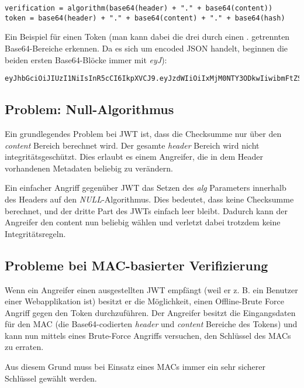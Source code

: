 \begin{verbatim}
verification = algorithm(base64(header) + "." + base64(content))
token = base64(header) + "." + base64(content) + "." + base64(hash)
\end{verbatim}

Ein Beispiel für einen Token (man kann dabei die drei durch einen . getrennten Base64-Bereiche erkennen. Da es sich um encoded JSON handelt, beginnen die beiden ersten Base64-Blöcke immer mit \textit{eyJ}):

\begin{verbatim}
eyJhbGciOiJIUzI1NiIsInR5cCI6IkpXVCJ9.eyJzdWIiOiIxMjM0NTY3ODkwIiwibmFtZSI6IkpvaG4gRG9lIiwiaWF0IjoxNTE2MjM5MDIyfQ.SflKxwRJSMeKKF2QT4fwpMeJf36POk6yJV_adQssw5c
\end{verbatim}

\subsection{Problem: Null-Algorithmus}

Ein grundlegendes Problem bei JWT ist, dass die Checksumme nur über den \textit{content} Bereich berechnet wird. Der gesamte \textit{header} Bereich wird nicht integritätsgeschützt. Dies erlaubt es einem Angreifer, die in dem Header vorhandenen Metadaten beliebig zu verändern.

Ein einfacher Angriff gegenüber JWT das Setzen des \textit{alg} Parameters innerhalb des Headers auf den \textit{NULL}-Algorithmus. Dies bedeutet, dass keine Checksumme berechnet, und der dritte Part des JWTs einfach leer bleibt. Dadurch kann der Angreifer den content nun beliebig wählen und verletzt dabei trotzdem keine Integritätsregeln.

\subsection{Probleme bei MAC-basierter Verifizierung}

Wenn ein Angreifer einen ausgestellten JWT empfängt (weil er z. B. ein Benutzer einer Webapplikation ist) besitzt er die Möglichkeit, einen Offline-Brute Force Angriff gegen den Token durchzuführen. Der Angreifer besitzt die Eingangsdaten für den MAC (die Base64-codierten \textit{header} und \textit{content} Bereiche des Tokens) und kann nun mittels eines Brute-Force Angriffs versuchen, den Schlüssel des MACs zu erraten.

Aus diesem Grund muss bei Einsatz eines MACs immer ein sehr sicherer Schlüssel gewählt werden.


